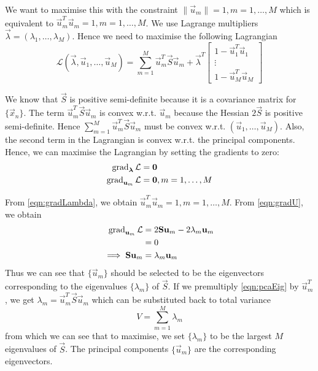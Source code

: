 We want to maximise this with the constraint $\|\vec u_m\| = 1, m = 1, \dotsc, M$ which is equivalent to $\vec u_m^T \vec u_m = 1, m = 1, \dotsc, M$. We use Lagrange multipliers $\vec \lambda = (\lambda_1, \dotsc, \lambda_M)$. Hence we need to maximise the following Lagrangian
\begin{equation*}
    \mathcal L(\vec \lambda, \vec u_1, \dotsc, \vec u_M) = \sum_{m = 1}^M \vec u_m^T \vec S \vec u_m + \vec \lambda^T
        \begin{bmatrix}
            1 - \vec u_1^T \vec u_1 \\
            \vdots \\
            1 - \vec u_M^T \vec u_M
        \end{bmatrix}
\end{equation*}

We know that $\vec S$ is positive semi-definite because it is a covariance matrix for $\{\vec x_n\}$. The term $\vec u_m^T \vec S \vec u_m$ is convex w.r.t. $\vec u_m$ because the Hessian $2 \vec S$ is positive semi-definite. Hence $\sum_{m = 1}^M \vec u_m^T \vec S \vec u_m$ must be convex w.r.t. $(\vec u_1, \dotsc, \vec u_M)$. Also, the second term in the Lagrangian is convex w.r.t. the principal components. Hence, we can maximise the Lagrangian by setting the gradients to zero:
\begin{align}
    \operatorname{\mathrm{grad}}_{\boldsymbol{\mathbf{\lambda}}}{\mathcal L}    &= \boldsymbol{\mathbf{0}} \label{eqn:gradLambda}\\
    \operatorname{\mathrm{grad}}_{\boldsymbol{\mathbf{u}}_m}{\mathcal L}        &= \boldsymbol{\mathbf{0}}, m = 1, \dotsc, M \label{eqn:gradU}
\end{align}

From \eqref{eqn:gradLambda}, we obtain $\vec u_m^T \vec u_m = 1, m = 1, \dotsc, M$. From \eqref{eqn:gradU}, we obtain
\begin{align}
    \operatorname{\mathrm{grad}}_{\boldsymbol{\mathbf{u}}_m}{\mathcal L}    &= 2 \boldsymbol{\mathbf{S}} \boldsymbol{\mathbf{u}}_m - 2 \lambda_m \boldsymbol{\mathbf{u}}_m \\
                                    &= 0 \\
    \implies \boldsymbol{\mathbf{S}} \boldsymbol{\mathbf{u}}_m        &= \lambda_m \boldsymbol{\mathbf{u}}_m \label{eqn:pcaEig}
\end{align}
Thus we can see that $\{\vec u_m\}$ should be selected to be the eigenvectors corresponding to the eigenvalues $\{\lambda_m\}$ of $\vec S$. If we premultiply \eqref{eqn:pcaEig} by $\vec u_m^T$, we get $\lambda_m = \vec u_m^T \vec S \vec u_m$ which can be substituted back to total variance
\begin{equation*}
    V = \sum_{m = 1}^M \lambda_m
\end{equation*}
from which we can see that to maximise, we set $\{\lambda_m\}$ to be the largest $M$ eigenvalues of $\vec S$. The principal components $\{\vec u_m\}$ are the corresponding eigenvectors.

